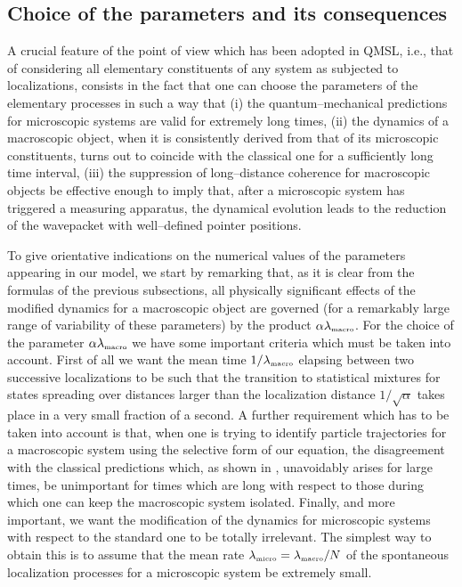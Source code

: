 \documentclass[12pt]{article}
\begin{document}
\subsection{Choice of the parameters and its consequences}
\label{sec55}

A crucial feature of the point of view which has been adopted in
QMSL, i.e., that of considering all elementary constituents of any
system as subjected to localizations, consists in the fact that
one can choose the parameters of the elementary processes in such
a way that (i) the quantum--mechanical predictions for microscopic
systems are valid for extremely long times, (ii) the dynamics of a
macroscopic object, when it is consistently derived from that of
its microscopic constituents, turns out to coincide with the
classical one for a sufficiently long time interval, (iii) the
suppression of long--distance coherence for macroscopic objects be
effective enough to imply that, after a microscopic system has
triggered a measuring apparatus, the dynamical evolution leads to
the reduction of the wavepacket with well--defined pointer
positions.

To give orientative indications on the numerical values of the
parameters appearing in our model, we start by remarking that, as
it is clear from the formulas of the previous subsections, all
physically significant effects of the modified dynamics for a
macroscopic object are governed (for a remarkably large range of
variability of these parameters) by the product
$\alpha\lambda_{\makebox{\tiny macro}}$. For the choice of the
parameter $\alpha\lambda_{\makebox{\tiny macro}}$ we have some
important criteria which must be taken into account. First of all we want
the mean time $1/\lambda_{\makebox{\tiny macro}}$ elapsing between
two successive localizations to be such that the transition to
statistical mixtures for states spreading over distances larger
than the localization distance $1/\sqrt{\alpha}$ takes place in a
very small fraction of a second. A further requirement which has
to be taken into account is that, when one is trying to identify
particle trajectories for a macroscopic system using the selective
form of our equation, the disagreement with the classical
predictions which, as shown in \cite{grw}, unavoidably arises for
large times, be unimportant for times which are long with respect
to those during which one can keep the macroscopic system
isolated. Finally, and more important, we want  the
modification of the dynamics for microscopic systems with respect
to the standard one to be totally irrelevant. The simplest way to
obtain this is to assume that the mean rate
$\lambda_{\makebox{\tiny micro}} = \lambda_{\makebox{\tiny
macro}}/N$ of the spontaneous localization processes for a
microscopic system be extremely small.
\end{document}
